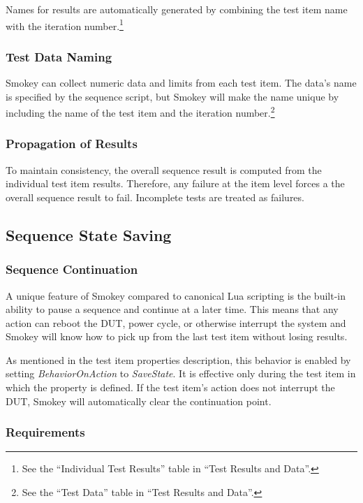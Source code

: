 \documentclass[11pt]{article}
\newcommand{\prop}[1]{{\itshape#1}}
\begin{document}
Names for results are automatically generated by combining the test item name
with the iteration number.\footnote{See the ``Individual Test Results'' table
in ``Test Results and Data''.}

\subsubsection{Test Data Naming}

Smokey can collect numeric data and limits from each test item.  The data's
name is specified by the sequence script, but Smokey will make the name unique
by including the name of the test item and the iteration number.\footnote{See
the ``Test Data'' table in ``Test Results and Data''.}

\subsubsection{Propagation of Results}

To maintain consistency, the overall sequence result is computed from the
individual test item results.  Therefore, any failure at the item level forces
a the overall sequence result to fail.  Incomplete tests are treated as
failures.

\subsection{Sequence State Saving}

\subsubsection{Sequence Continuation}

A unique feature of Smokey compared to canonical Lua scripting is the built-in
ability to pause a sequence and continue at a later time.  This means that any
action can reboot the DUT, power cycle, or otherwise interrupt the system and
Smokey will know how to pick up from the last test item without losing results.

As mentioned in the test item properties description, this behavior is enabled
by setting \prop{BehaviorOnAction} to \prop{SaveState}.  It is effective only during the test
item in which the property is defined.  If the test item's action does not
interrupt the DUT, Smokey will automatically clear the continuation point.

\subsubsection{Requirements}
\end{document}
